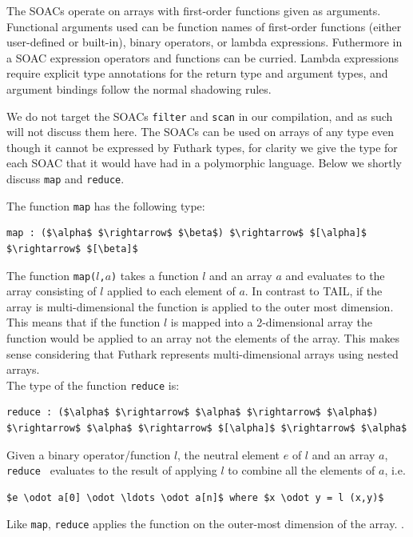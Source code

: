 \documentclass[11pt]{article}
\begin{document}
The SOACs operate on arrays with first-order functions given as arguments.
Functional arguments used can be function names of first-order functions (either user-defined or built-in), 
binary operators, or lambda expressions.
Futhermore in a SOAC expression operators and functions can be curried. Lambda expressions require explicit type annotations for
the return type and argument types, and argument bindings follow the normal shadowing rules.

We do not target the SOACs {\tt filter} and {\tt scan} in our compilation, and as such will not discuss them here.
The SOACs can be used on arrays of any type even though it cannot be expressed by Futhark types, for clarity we give the type for each SOAC that it would have had in a polymorphic language.
Below we shortly discuss {\tt map} and {\tt reduce}.

The function {\tt map} has the following type: 
\begin{lstlisting}[numbers=none,frame=none]
map : ($\alpha$ $\rightarrow$ $\beta$) $\rightarrow$ $[\alpha]$ $\rightarrow$ $[\beta]$
\end{lstlisting}
The function {\tt map($l$,$a$)} takes a function $l$ and an array $a$ and evaluates to the array consisting of $l$ applied to each element of $a$.
In contrast to TAIL, if the array is multi-dimensional the function is applied to the outer most dimension.
This means that if the function $l$ is mapped into a 2-dimensional array the function would be applied to an array not the elements
of the array. This makes sense considering that Futhark represents multi-dimensional arrays using nested arrays.\\

The type of the function {\tt reduce} is: 
\begin{lstlisting}[numbers=none,frame=none]
reduce : ($\alpha$ $\rightarrow$ $\alpha$ $\rightarrow$ $\alpha$) $\rightarrow$ $\alpha$ $\rightarrow$ $[\alpha]$ $\rightarrow$ $\alpha$
\end{lstlisting}
Given a binary operator/function $l$, the neutral element $e$ of $l$ and an array $a$,
{\tt reduce } evaluates to the result of applying $l$ to combine all the elements of $a$, i.e. 
\begin{lstlisting}[numbers=none,frame=none]
$e \odot a[0] \odot \ldots \odot a[n]$ where $x \odot y = l (x,y)$
\end{lstlisting}
Like {\tt map}, {\tt reduce} applies the function on the outer-most dimension of the array. \cite{TroelsHenriksen}.\\ 
\end{document}
